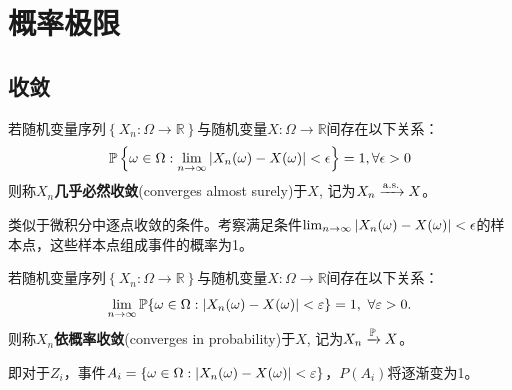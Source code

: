 \chapter{概率极限}\label{chap:limitation}

\section{收敛}

\begin{definition}
    若随机变量序列$\left\{ X_n: \Omega \to \mathbb{R} \right\}$与随机变量$X:\Omega \to \mathbb{R}$间存在以下关系：
    \[ \P\left\{ \omega \in \Omega: \lim_{n \to \infty}\abs{ X_n(\omega) - X(\omega)} < \epsilon \right\} =1, \forall \epsilon > 0\]
    则称$X_{n}$\textbf{几乎必然收敛}(converges almost surely)于$X$, 记为$X_{n} \xrightarrow{\as} X$。
\end{definition}

\begin{remark}
    类似于微积分中逐点收敛的条件。考察满足条件$\lim_{n \to \infty}\abs{ X_n(\omega) - X(\omega)} < \epsilon$的样本点，这些样本点组成事件的概率为1。
\end{remark}



\begin{definition}
    若随机变量序列$\left\{ X_n: \Omega \to \mathbb{R} \right\}$与随机变量$X:\Omega \to \mathbb{R}$间存在以下关系：
    \[ \lim_{n\to\infty}\P\{\omega \in \Omega: \abs{X_n(\omega) - X(\omega)}<\e\} = 1, \ \forall \e>0. \]
    则称$X_{n}$\textbf{依概率收敛}(converges in probability)于$X$, 记为$X_{n} \xrightarrow{\P} X$。
\end{definition}

\begin{remark}
    即对于$Z_i$，事件$A_i=\{\omega \in \Omega: \abs{X_n(\omega) - X(\omega)}<\e\}$，$P(A_i)$将逐渐变为1。
\end{remark}

